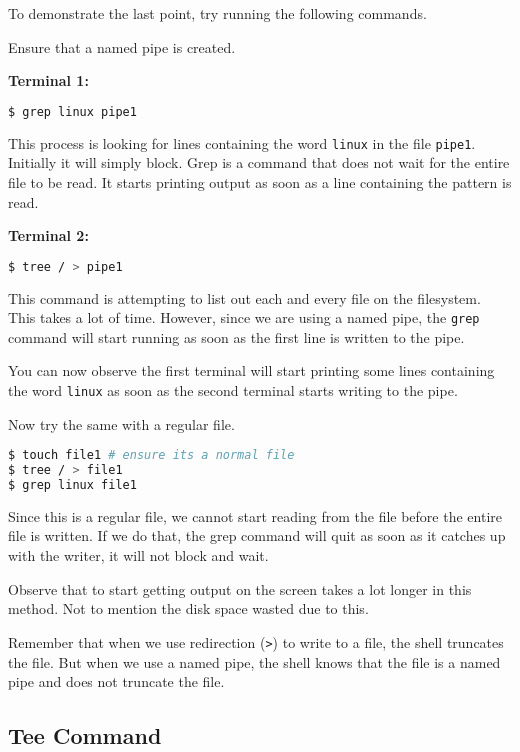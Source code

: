 To demonstrate the last point, try running the following commands.

Ensure that a named pipe is created.

\textbf{Terminal 1:}

\begin{lstlisting}[language=bash]
$ grep linux pipe1
\end{lstlisting}

This process is looking for lines containing the word \lstinline|linux|
in the file \lstinline|pipe1|. Initially it will simply block.
Grep is a command that does not wait for the entire file to be read.
It starts printing output as soon as a line containing the pattern
is read.

\textbf{Terminal 2:}
\begin{lstlisting}[language=bash]
$ tree / > pipe1
\end{lstlisting}

This command is attempting to list out each and every file on
the filesystem. This takes a lot of time. However, since
we are using a named pipe, the \lstinline|grep| command will start
running as soon as the first line is written to the pipe.

You can now observe the first terminal will start printing
some lines containing the word \lstinline|linux| as soon as the
second terminal starts writing to the pipe.

Now try the same with a regular file.

\begin{lstlisting}[language=bash]
$ touch file1 # ensure its a normal file
$ tree / > file1
$ grep linux file1
\end{lstlisting}

Since this is a regular file, we cannot start reading from the
file before the entire file is written. If we do that, the grep
command will quit as soon as it catches up with the writer, it
will not block and wait.

Observe that to start getting output on the screen takes a lot
longer in this method. Not to mention the disk space wasted
due to this.

\begin{remark}
  Remember that when we use redirection (\lstinline|>|) to write to a file,
  the shell truncates the file. But when we use a named pipe, the shell
  knows that the file is a named pipe and does not truncate the file.
\end{remark}

\subsection{Tee Command}

